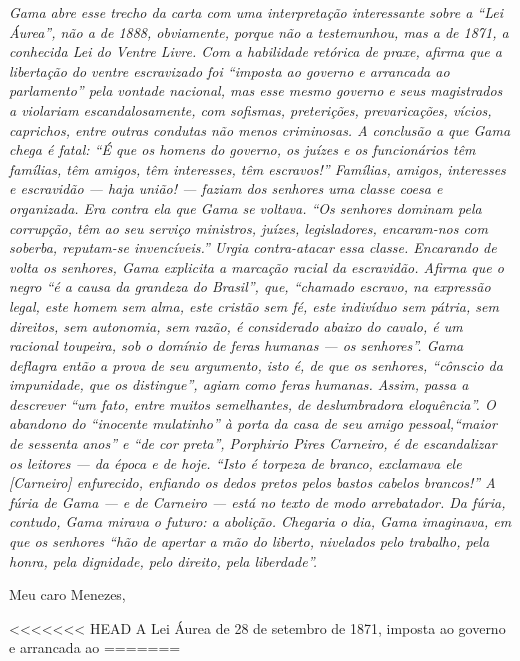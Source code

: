 \begin{resumo}
\emph{Gama abre esse trecho da carta com uma interpretação interessante
sobre a ``Lei Áurea'', não a de 1888, obviamente, porque não a
testemunhou, mas a de 1871, a conhecida Lei do Ventre Livre. Com a
habilidade retórica de praxe, afirma que a libertação do ventre
escravizado foi ``imposta ao governo e arrancada ao parlamento'' pela
vontade nacional, mas esse mesmo governo e seus magistrados a violariam
escandalosamente, com sofismas, preterições, prevaricações, vícios,
caprichos, entre outras condutas não menos criminosas. A conclusão a que
Gama chega é fatal: ``É que os homens do governo, os juízes e os
funcionários têm famílias, têm amigos, têm interesses, têm escravos!''
Famílias, amigos, interesses e escravidão --- haja união! --- faziam dos
senhores uma classe coesa e organizada. Era contra ela que Gama se
voltava. ``Os senhores dominam pela corrupção, têm ao seu serviço
ministros, juízes, legisladores, encaram-nos com soberba, reputam-se
invencíveis.'' Urgia contra-atacar essa classe. Encarando de volta os
senhores, Gama explicita a marcação racial da escravidão. Afirma que o
negro ``é a causa da grandeza do Brasil'', que, ``chamado escravo, na
expressão legal, este homem sem alma, este cristão sem fé, este
indivíduo sem pátria, sem direitos, sem autonomia, sem razão, é
considerado abaixo do cavalo, é um racional toupeira, sob o domínio de
feras humanas --- os senhores''. Gama deflagra então a prova de seu
argumento, isto é, de que os senhores, ``cônscio da impunidade, que os
distingue'', agiam como feras humanas. Assim, passa a descrever ``um fato,
entre muitos semelhantes, de deslumbradora eloquência''. O abandono do
``inocente mulatinho'' à porta da casa de seu amigo pessoal,``maior de
sessenta anos'' e ``de cor preta'', Porphirio Pires Carneiro, é de
escandalizar os leitores --- da época e de hoje. ``Isto é torpeza de
branco, exclamava ele {[}Carneiro{]} enfurecido, enfiando os dedos
pretos pelos bastos cabelos brancos!'' A fúria de Gama --- e de Carneiro
--- está no texto de modo arrebatador. Da fúria, contudo, Gama mirava o
futuro: a abolição. Chegaria o dia, Gama imaginava, em que os senhores
``hão de apertar a mão do liberto, nivelados pelo trabalho, pela honra,
pela dignidade, pelo direito, pela liberdade''. }
\end{resumo}

Meu caro Menezes,

<<<<<<< HEAD
A Lei Áurea de 28 de setembro de 1871, imposta ao governo e arrancada ao
=======

